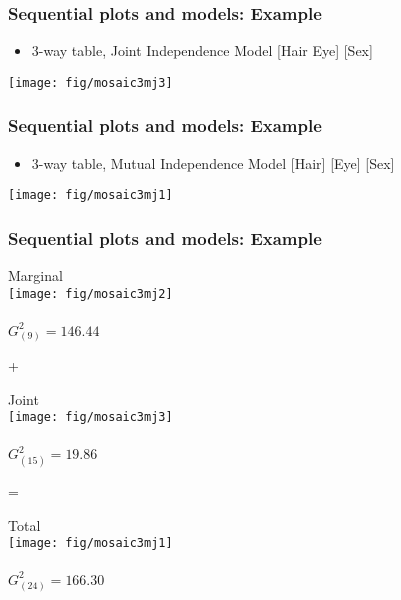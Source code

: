 \begin{frame}
   \frametitle{Sequential plots and models: Example}
  \begin{itemize}
    \item 3-way table, Joint Independence Model [Hair Eye] [Sex]
  \end{itemize}
\begin{center}
  \texttt{[image: fig/mosaic3mj3]}
\end{center}
   
\end{frame}

\begin{frame}
   \frametitle{Sequential plots and models: Example}
  \begin{itemize}
    \item 3-way table, Mutual Independence Model [Hair] [Eye] [Sex]
  \end{itemize}
\begin{center}
  \texttt{[image: fig/mosaic3mj1]}
\end{center}
   
\end{frame}

\begin{frame}
   \frametitle{Sequential plots and models: Example}
 \begin{minipage}[c]{.3\textwidth}
  \centering Marginal 
  \\ \texttt{[image: fig/mosaic3mj2]}
  \\ \centering [Hair] [Eye]
  \\ \centering $G^2_{(9)} = 146.44$
 \end{minipage}%
 \hfill {\Large +} \hfill
 \begin{minipage}[c]{.3\textwidth}
  \centering Joint 
  \\ \texttt{[image: fig/mosaic3mj3]}
  \\ 
  \\ \centering $G^2_{(15)} = 19.86$
 \end{minipage}
 \hfill {\Large =} \hfill
 \begin{minipage}[c]{.3\textwidth}
  \centering Total 
  \\ \texttt{[image: fig/mosaic3mj1]}
  \\ \centering [Hair] [Eye] [Sex]
  \\ \centering $G^2_{(24)} = 166.30$
 \end{minipage}
 
\end{frame}

